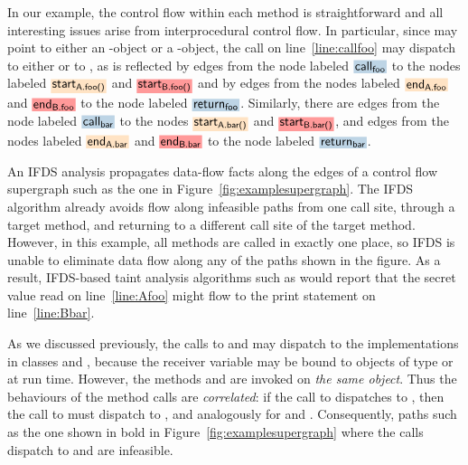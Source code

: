 In our example, the control flow within each method is straightforward and
all interesting issues arise from interprocedural control flow. In particular,
since   may point to either an -object or a -object, 
the call on line~\ref{line:callfoo} may dispatch to either  or to ,
as is reflected by edges  
  from the node labeled $\highlight{\code{call}_\code{foo}}{greyblue}$ to the nodes labeled
  $\highlight{\code{start}_\code{A.foo()}}{bisque}$ and $\highlight{\code{start}_\code{B.foo()}}{lightsalmonpink}$
and by edges
  from the nodes labeled $\highlight{\code{end}_\code{A.foo}}{bisque}$ and $\highlight{\code{end}_\code{B.foo}}{lightsalmonpink}$ 
  to the node labeled  $\highlight{\code{return}_\code{foo}}{greyblue}$.  
Similarly, there are edges from the node labeled $\highlight{\code{call}_\code{bar}}{greyblue}$ to the nodes 
$\highlight{\code{start}_\code{A.bar()}}{bisque}$ and $\highlight{\code{start}_\code{B.bar()}}{lightsalmonpink}$, and 
edges
  from the nodes labeled $\highlight{\code{end}_\code{A.bar}}{bisque}$ and $\highlight{\code{end}_\code{B.bar}}{lightsalmonpink}$ 
  to the node labeled  $\highlight{\code{return}_\code{bar}}{greyblue}$. 

 
 
An IFDS analysis propagates data-flow facts along the edges
of a control flow supergraph such as the one in Figure~\ref{fig:examplesupergraph}. The
IFDS algorithm already avoids flow along infeasible paths from one call site, through a target method,
and returning to a different call site of the target method.
However, in this example, all methods are
called in exactly one place, so IFDS is unable to eliminate data flow along any of the
paths shown in the figure. As a result, IFDS-based taint analysis algorithms such as
\cite{DBLP:conf/issta/GuarnieriPTDTB11,DBLP:conf/pldi/ArztRFBBKTOM14} would report 
that the secret value read on line~\ref{line:Afoo}
might flow to the print statement on line~\ref{line:Bbar}. 

As we discussed previously, the calls to  and  may dispatch
to the implementations in classes  and , 
because the receiver variable  may be bound to
 objects of type  or  at run time. 
However, the methods  and  are invoked
on \textit{the same object}. Thus the behaviours of the method calls
are \textit{correlated}: if the call to  dispatches to ,
then the call to  must dispatch to , and analogously
for  and .
Consequently, paths such as the one shown in bold in
Figure~\ref{fig:examplesupergraph} where the calls dispatch to
 and 
are infeasible.  

